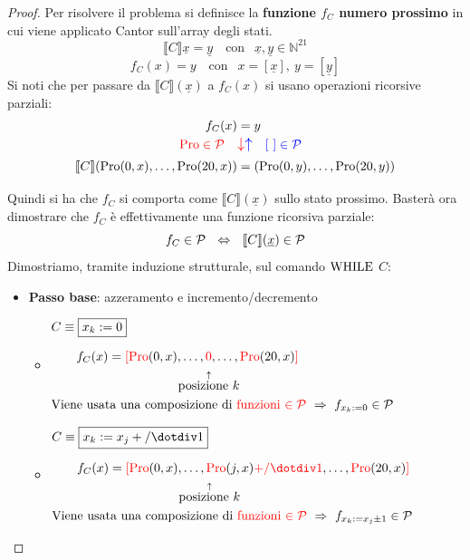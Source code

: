 \begin{proof}
	Per risolvere il problema si definisce la \textbf{funzione $f_C$ numero prossimo} in cui viene applicato Cantor sull'array degli stati.
	$$ \llbracket C \rrbracket \underline{x} = \underline{y} \quad \text{con }
	\ \ \underline{x},\underline{y}\in \mathbb{N}^{21}$$
	$$ f_C(x)=y \quad \text{con }
	\ \ x=[ \underline{x} ] ,\ y= [ \underline{y} ]$$
	Si noti che per passare da $\llbracket C \rrbracket (\underline{x})$ a $f_C(x)$ 
	si usano operazioni ricorsive parziali:
	$$\begin{aligned}
		f_C(x)&=y \\
		{\color{red}\pro \in \cp}\quad &
		\mathlarger{{\color{red}\downarrow}{\color{blue}\uparrow}}
		\quad\color{blue} [ \ ] \in \cp \\
		\llbracket C \rrbracket (\pro(0,x),\dots,\pro(20,x))& =(\pro(0,y),\dots,\pro(20,y))
	\end{aligned}$$
	
	Quindi si ha che $f_C$ si comporta come $\llbracket C \rrbracket (\underline{x})$ sullo stato prossimo. Basterà ora dimostrare che $f_C$ è effettivamente una funzione ricorsiva parziale:
	$$ f_C\in \mathcal{P} \ \ \Leftrightarrow \ \ \llbracket C \rrbracket (\underline{x}) \in \mathcal{P} $$
	Dimostriamo, tramite induzione strutturale, sul comando $\text{WHILE}$ $C$:
	\begin{itemize}
		\item \textbf{Passo base}: azzeramento e incremento/decremento
		\begin{itemize}
			\renewcommand{\labelitemii}{\raisebox{5.2\height}{$-$}}
			\item $\begin{aligned}
				&C\equiv \boxed{x_k:=0} \\[.6em]
				&\hspace{2em}f_C(x) = {\color{red}[}
				{\color{red}\pro}(0,x),\dots,{\color{red}0},\dots,{\color{red}\pro}
				(20,x){\color{red}]}\\
				&\hspace{10.05em}\overset{\uparrow}{\text{posizione $k$}}\\
				& \text{Viene usata una composizione di {\color{red}funzioni 
						$\in\cp$}}
				\ \Rightarrow \ f_{x_k:=0}\in\cp
			\end{aligned}$
			\renewcommand{\labelitemii}{\raisebox{5.2\height}{$-$}}
			\item $\begin{aligned}
				&C\equiv \boxed{x_k:=x_j+/\dotminus 1}\\[.6em]
				&\hspace{2em}f_C(x) = {\color{red}[}
				{\color{red}\pro}(0,x),\dots,
				{\color{red}\pro}(j,x){\color{red}+/\dotminus 1}
				,\dots,{\color{red}\pro}
				(20,x){\color{red}]}\\
				&\hspace{10.05em}\overset{\uparrow}{\text{posizione $k$}}\\
				& \text{Viene usata una composizione di {\color{red}funzioni 
						$\in\cp$}}
				\ \Rightarrow \ f_{x_k:=x_j\pm1}\in\cp
			\end{aligned}$
		\end{itemize}


\end{itemize}
\end{proof}
